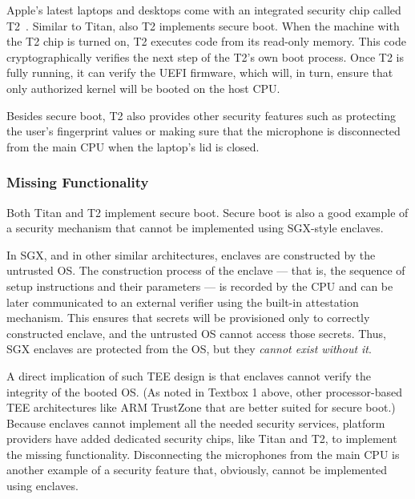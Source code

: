 Apple's latest laptops and desktops come with an integrated security chip called T2~\cite{t2}. Similar to Titan, also T2 implements secure boot. When the machine with the T2 chip is turned on, T2 executes code from its read-only memory. This code cryptographically verifies the next step of the T2's own boot process. Once T2 is fully running, it can verify the UEFI firmware, which will, in turn, ensure that only authorized kernel will be booted on the host CPU.

Besides secure boot, T2 also provides other security features such as protecting the user's fingerprint values or making sure that the microphone is disconnected from the main CPU when the laptop's lid is closed. 
 
 
\subsubsection*{Missing Functionality}
  
Both Titan and T2 implement secure boot. Secure boot is also a good example of a security mechanism that cannot be implemented using SGX-style enclaves. 

In SGX, and in other similar architectures, enclaves are constructed by the untrusted OS. The construction process of the enclave --- that is, the sequence of setup instructions and their parameters --- is recorded by the CPU and can be later communicated to an external verifier using the built-in attestation mechanism. This ensures that secrets will be provisioned only to correctly constructed enclave, and the untrusted OS cannot access those secrets. Thus, SGX enclaves are protected from the OS, but they \emph{cannot exist without it}. 

A direct implication of such TEE design is that enclaves cannot verify the integrity of the booted OS. (As noted in Textbox 1 above, other processor-based TEE architectures like ARM TrustZone that are better suited for secure boot.) Because enclaves cannot implement all the needed security services, platform providers have added dedicated security chips, like Titan and T2, to implement the missing functionality. Disconnecting the microphones from the main CPU is another example of a security feature that, obviously, cannot be implemented using enclaves.


